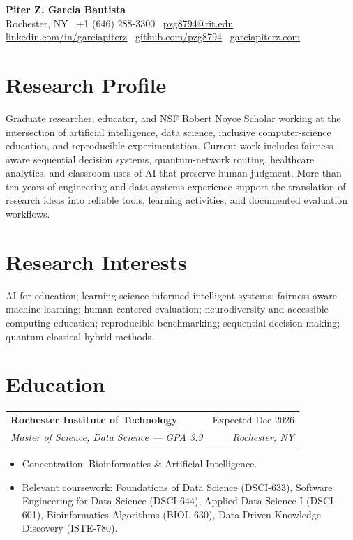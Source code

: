 \documentclass[10pt]{article}
\makeatletter
\newcommand{\entry}[4]{
  \noindent\begin{tabularx}{\textwidth}{@{}Xr@{}}
    \textbf{#1} & #2 \\
    \textit{#3} & \textit{#4}
  \end{tabularx}\vspace{1pt}
}
\makeatother
\begin{document}
\noindent
{\LARGE \textbf{Piter Z. Garcia Bautista}}\\[4pt]
Rochester, NY \textbar\ +1 (646) 288-3300 \textbar\ \href{mailto:pzg8794@rit.edu}{pzg8794@rit.edu}\\
\href{https://linkedin.com/in/garciapiterz}{linkedin.com/in/garciapiterz} \textbar\
\href{https://github.com/pzg8794}{github.com/pzg8794} \textbar\
\href{https://garciapiterz.com}{garciapiterz.com}
\vspace{6pt}

\section{Research Profile}
Graduate researcher, educator, and NSF Robert Noyce Scholar working at the intersection of artificial intelligence, data science, inclusive computer-science education, and reproducible experimentation. Current work includes fairness-aware sequential decision systems, quantum-network routing, healthcare analytics, and classroom uses of AI that preserve human judgment. More than ten years of engineering and data-systems experience support the translation of research ideas into reliable tools, learning activities, and documented evaluation workflows.

\section{Research Interests}
AI for education; learning-science-informed intelligent systems; fairness-aware machine learning; human-centered evaluation; neurodiversity and accessible computing education; reproducible benchmarking; sequential decision-making; quantum-classical hybrid methods.

\section{Education}

\entry{Rochester Institute of Technology}{Expected Dec 2026}{Master of Science, Data Science --- GPA 3.9}{Rochester, NY}
\begin{itemize}
  \item Concentration: Bioinformatics \& Artificial Intelligence.
  \item Relevant coursework: Foundations of Data Science (DSCI-633), Software Engineering for Data Science (DSCI-644), Applied Data Science I (DSCI-601), Bioinformatics Algorithms (BIOL-630), Data-Driven Knowledge Discovery (ISTE-780).
\end{itemize}
\end{document}
